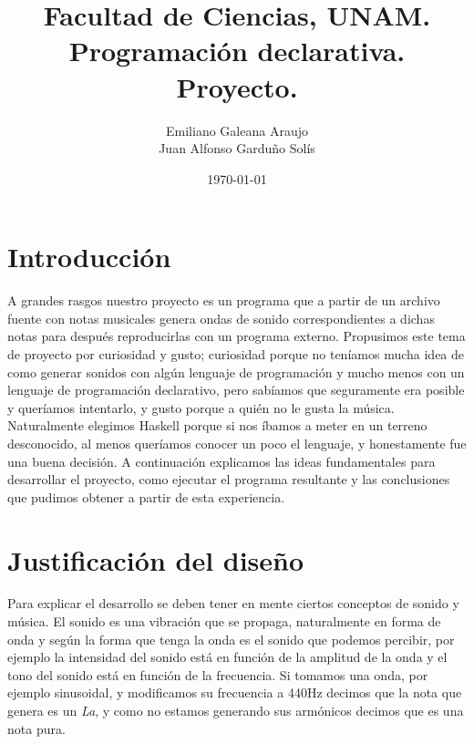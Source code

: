 \documentclass[10pt,a4paper]{article}
\title{Facultad de Ciencias, UNAM.\\Programación declarativa.\\ Proyecto.}
\author{Emiliano Galeana Araujo\\ Juan Alfonso Garduño Solís}
\date{\small{\today}}
\begin{document}
\maketitle
\section{Introducción}
\noindent A grandes rasgos nuestro proyecto es un programa que a partir de un
archivo fuente con notas musicales genera ondas de sonido correspondientes a
dichas notas  para después reproducirlas con un programa externo. Propusimos este
tema de proyecto por curiosidad y gusto; curiosidad porque no teníamos mucha idea
de como generar sonidos con algún lenguaje de programación y mucho menos con un
lenguaje de programación declarativo, pero sabíamos que seguramente era posible y
queríamos intentarlo, y gusto porque a quién no le gusta la música. Naturalmente
elegimos Haskell porque si nos íbamos a meter en un terreno desconocido, al menos
queríamos conocer un poco el lenguaje, y honestamente fue una buena decisión. A
continuación explicamos las ideas fundamentales para desarrollar el proyecto,
como ejecutar el programa resultante y las conclusiones que pudimos obtener a
partir de esta experiencia.

\section{Justificación del diseño}
\noindent Para explicar el desarrollo se deben tener en mente ciertos conceptos
de sonido y música. El sonido es una vibración que se propaga, naturalmente en
forma de onda y según la forma que tenga la onda es el sonido que podemos
percibir, por ejemplo la intensidad del sonido está en función de la amplitud
de la onda y el tono del sonido está en función de la frecuencia. Si tomamos una
onda, por ejemplo sinusoidal, y modificamos su frecuencia a 440Hz decimos que la
nota que genera es un \textit{La}, y como no estamos generando sus armónicos
decimos que es una nota pura.
\end{document}
